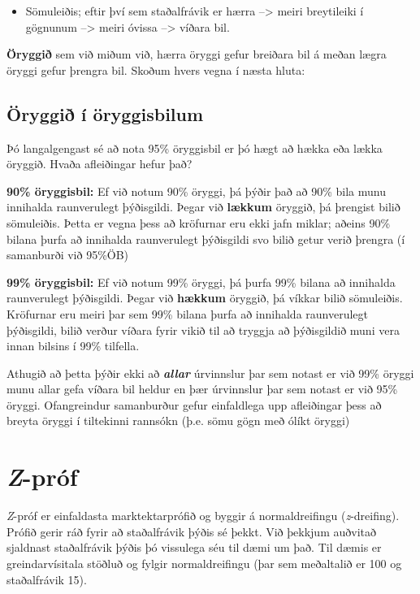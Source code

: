 \documentclass[
]{book}
\providecommand{\tightlist}{%
  \setlength{\itemsep}{0pt}\setlength{\parskip}{0pt}}
\begin{document}
\begin{itemize}
\tightlist
\item
  Sömuleiðis; eftir því sem staðalfrávik er hærra --\textgreater{} meiri breytileiki í gögnunum --\textgreater{} meiri óvissa --\textgreater{} víðara bil.
\end{itemize}

\textbf{Öryggið} sem við miðum við, hærra öryggi gefur breiðara bil á meðan lægra öryggi gefur þrengra bil. Skoðum hvers vegna í næsta hluta:

\hypertarget{uxf6ryggiuxf0-uxed-uxf6ryggisbilum}{%
\section{Öryggið í öryggisbilum}\label{uxf6ryggiuxf0-uxed-uxf6ryggisbilum}}

Þó langalgengast sé að nota 95\% öryggisbil er þó hægt að hækka eða lækka öryggið. Hvaða afleiðingar hefur það?

\textbf{90\% öryggisbil:} Ef við notum 90\% öryggi, þá þýðir það að 90\% bila munu innihalda raunverulegt þýðisgildi. Þegar við \textbf{lækkum} öryggið, þá þrengist bilið sömuleiðis. Þetta er vegna þess að kröfurnar eru ekki jafn miklar; aðeins 90\% bilana þurfa að innihalda raunverulegt þýðisgildi svo bilið getur verið þrengra (í samanburði við 95\%ÖB)

\textbf{99\% öryggisbil:} Ef við notum 99\% öryggi, þá þurfa 99\% bilana að innihalda raunverulegt þýðisgildi. Þegar við \textbf{hækkum} öryggið, þá víkkar bilið sömuleiðis. Kröfurnar eru meiri þar sem 99\% bilana þurfa að innihalda raunverulegt þýðisgildi, bilið verður víðara fyrir vikið til að tryggja að þýðisgildið muni vera innan bilsins í 99\% tilfella.

Athugið að þetta þýðir ekki að \textbf{\emph{allar}} úrvinnslur þar sem notast er við 99\% öryggi munu allar gefa víðara bil heldur en þær úrvinnslur þar sem notast er við 95\% öryggi. Ofangreindur samanburður gefur einfaldlega upp afleiðingar þess að breyta öryggi í tiltekinni rannsókn (þ.e. sömu gögn með ólíkt öryggi)

\hypertarget{z-pruxf3f}{%
\chapter{\texorpdfstring{\emph{Z}-próf}{Z-próf}}\label{z-pruxf3f}}

\emph{Z}-próf er einfaldasta marktektarprófið og byggir á normaldreifingu (\emph{z}-dreifing). Prófið gerir ráð fyrir að staðalfrávik þýðis sé þekkt. Við þekkjum auðvitað sjaldnast staðalfrávik þýðis þó vissulega séu til dæmi um það. Til dæmis er greindarvísitala stöðluð og fylgir normaldreifingu (þar sem meðaltalið er 100 og staðalfrávik 15).
\end{document}
